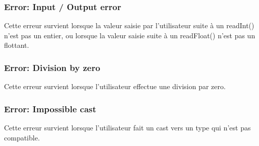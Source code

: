 \documentclass[12pt, a4paper, one side]{article}
\begin{document}
    \subsubsection{Error: Input / Output error}
    Cette erreur survient lorsque la  valeur saisie par l'utilisateur suite à un readInt() n'est pas un entier, ou lorsque la valeur saisie suite à un readFloat() n'est pas un flottant.

    \subsubsection{Error: Division by zero}
    Cette erreur survient lorsque l'utilisateur effectue une division par zero.

    \subsubsection{Error: Impossible cast}
    Cette erreur survient lorsque l'utilisateur fait un cast vers un type qui n'est pas compatible.
\end{document}

